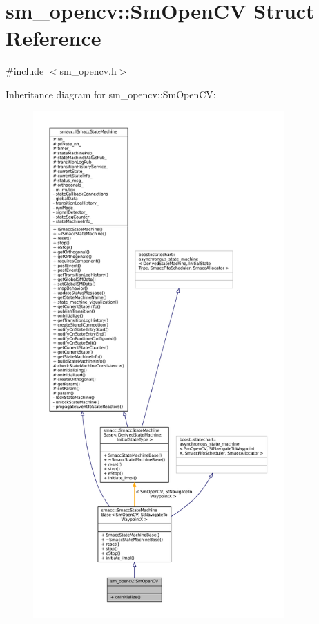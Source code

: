 \hypertarget{structsm__opencv_1_1SmOpenCV}{}\section{sm\+\_\+opencv\+:\+:Sm\+Open\+CV Struct Reference}
\label{structsm__opencv_1_1SmOpenCV}


{\ttfamily \#include $<$sm\+\_\+opencv.\+h$>$}



Inheritance diagram for sm\+\_\+opencv\+:\+:Sm\+Open\+CV\+:
\nopagebreak
\begin{figure}[H]
\begin{center}
\leavevmode
\includegraphics[height=550pt]{structsm__opencv_1_1SmOpenCV__inherit__graph}
\end{center}
\end{figure}


